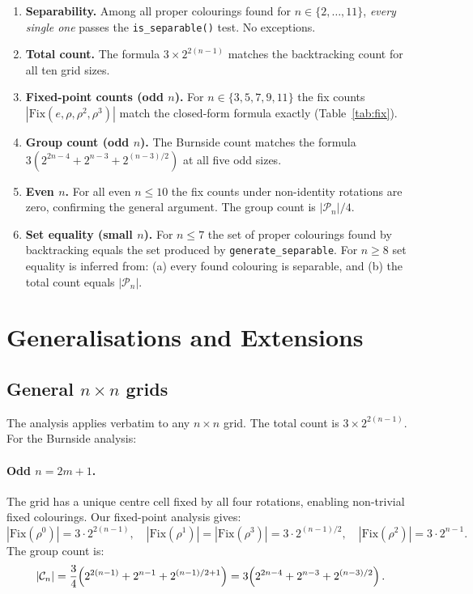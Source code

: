 \documentclass{article}
\newcommand{\calC}{\mathcal{C}}
\newcommand{\calP}{\mathcal{P}}
\newcommand{\Fix}{\mathrm{Fix}}
\begin{document}
\begin{enumerate}
  \item \textbf{Separability.}  Among all proper colourings
    found for $n\in\{2,\ldots,11\}$, \emph{every single one}
    passes the \texttt{is\_separable()} test.  No exceptions.

  \item \textbf{Total count.}  The formula $3\times 2^{2(n-1)}$
    matches the backtracking count for all ten grid sizes.

  \item \textbf{Fixed-point counts (odd $n$).}
    For $n \in \{3,5,7,9,11\}$ the fix counts
    $|\Fix(e,\rho,\rho^2,\rho^3)|$ match the closed-form
    formula exactly (Table~\ref{tab:fix}).

  \item \textbf{Group count (odd $n$).}
    The Burnside count matches the formula
    $3(2^{2n-4}+2^{n-3}+2^{(n-3)/2})$ at all five odd sizes.

  \item \textbf{Even $n$.}
    For all even $n \le 10$ the fix counts under non-identity
    rotations are zero, confirming the general argument.
    The group count is $|\calP_n|/4$.

  \item \textbf{Set equality (small $n$).}
    For $n\leq 7$ the set of proper colourings found by
    backtracking equals the set produced by
    \texttt{generate\_separable}.  For $n\geq 8$ set equality
    is inferred from: (a) every found colouring is separable,
    and (b) the total count equals $|\calP_n|$.
\end{enumerate}

\section{Generalisations and Extensions}
\label{sec:extensions}

\subsection{General $n\times n$ grids}

The analysis applies verbatim to any $n\times n$ grid.
The total count is $3\times 2^{2(n-1)}$.
For the Burnside analysis:

\paragraph{Odd $n=2m+1$.}
The grid has a unique centre cell fixed by all four rotations,
enabling non-trivial fixed colourings.  Our fixed-point
analysis gives:
\[
  |\Fix(\rho^0)| = 3\cdot 2^{2(n-1)},\quad
  |\Fix(\rho^1)| = |\Fix(\rho^3)| = 3\cdot 2^{(n-1)/2},\quad
  |\Fix(\rho^2)| = 3\cdot 2^{n-1}.
\]
The group count is:
\[
  |\calC_n| = \frac{3}{4}\Bigl(2^{2(n-1)}+2^{n-1}+2^{(n-1)/2+1}\Bigr)
  = 3\!\left(2^{2n-4}+2^{n-3}+2^{(n-3)/2}\right).
\]
\end{document}
